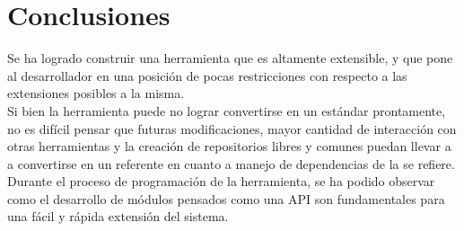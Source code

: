\section{Conclusiones}

Se ha logrado construir una herramienta que es altamente extensible, y que pone al
desarrollador en una posición de pocas restricciones con respecto a las extensiones
posibles a la misma.\\
Si bien la herramienta puede no lograr convertirse en un estándar prontamente, no
es difícil pensar que futuras modificaciones, mayor cantidad de interacción con
otras herramientas y la creación de repositorios libres y comunes puedan llevar a
\fronttier a convertirse en un referente en cuanto a manejo de dependencias de la
\viewtier se refiere.\\
Durante el proceso de programación de la herramienta, se ha podido observar como el
desarrollo de módulos pensados como una API son fundamentales para una fácil y rápida
extensión del sistema.